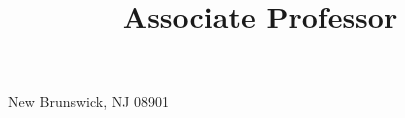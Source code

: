 



\usepackage{url,fancyhdr}

\usepackage{fontspec}
\usepackage{xunicode}
\usepackage{xcolor}

\let\sups\relax
\usepackage{tipa}
\usepackage{multicol}
\usepackage[spanish, english]{babel}
\usepackage{natbib}
\usepackage{bibentry}
\newcommand{\bibverse}[1]{\begin{verse} \bibentry{#1}. \end{verse}}
\usepackage{hanging}
\usepackage{fontawesome5}
\usepackage{academicons}

\usepackage[scale=0.8]{geometry}





\title{Associate Professor}
\address{Rutgers University \\ 
         Department of Spanish and Portuguese}{New Brunswick, NJ 08901}
\def\mytitle{Associate Professor}
\def\myphone{(848) 932-6930}
\def\myskype{casillas.joseph}
\def\myemail{joseph.casillas@rutgers.edu}
\def\myweb{www.jvcasillas.com}
\def\facweb{https://span-port.rutgers.edu/people/faculty/30-personnel/faculty/771-joseph-casillas}
\def\school{Rutgers University}
\def\schoolweb{https://www.rutgers.edu}



